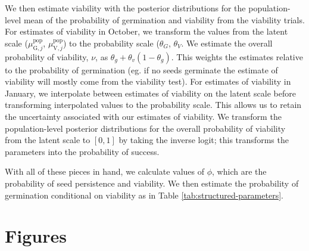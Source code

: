\documentclass[12pt, oneside, titlepage]{article}   	%
\begin{document}
We then estimate viability with the posterior distributions for the population-level mean of the probability of germination and viability from the viability trials. For estimates of viability in October, we transform the values from the latent scale ($\mu^\mathrm{pop}_{\mathrm{G},j}$, $\mu^\mathrm{pop}_{\mathrm{V},j}$) to the probability scale ($\theta_G$, $\theta_V$. We estimate the overall probability of viability, $\nu$, as $\theta_g + \theta_v (1-\theta_g)$. This weights the estimates relative to the probability of germination (eg. if no seeds germinate the estimate of viability will mostly come from the viability test). For estimates of viability in January, we interpolate between estimates of viability on the latent scale before transforming interpolated values to the probability scale. This allows us to retain the uncertainty associated with our estimates of viability. We transform the population-level posterior distributions for the overall probability of viability from the latent scale to $[0,1]$ by taking the inverse logit; this transforms the parameters into the probability of success.

With all of these pieces in hand, we calculate values of $\phi$, which are the probability of seed persistence and viability. We then estimate the probability of germination conditional on viability as in Table \ref{tab:structured-parameters}.

\newpage

\section*{Figures}
\end{document}
